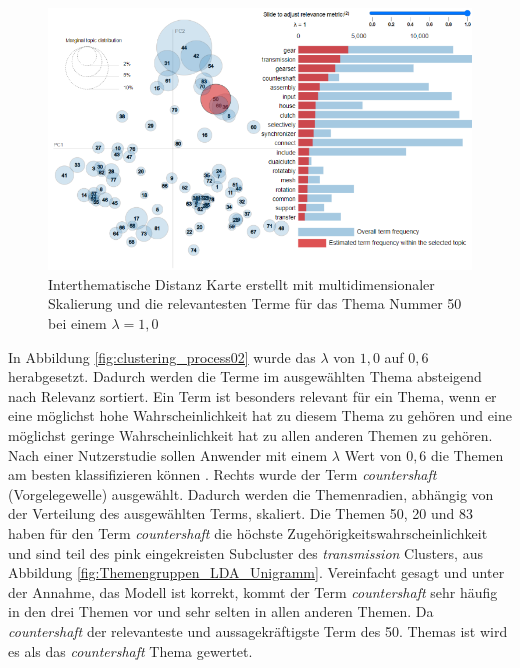 \begin{landscape}
 \begin{figure}
	\centering
	\includegraphics[width=19.29cm,keepaspectratio=true]{img/clustering_process01.png}
	\caption{
		Interthematische Distanz Karte erstellt mit multidimensionaler Skalierung und die relevantesten Terme für das Thema Nummer 50 bei einem $\lambda = 1,0$
	}
	\label{fig:clustering_process01}
 \end{figure}
\end{landscape}

 
 
In Abbildung \ref{fig:clustering_process02} wurde das $\lambda$ von $1,0$ auf $0,6$ herabgesetzt. Dadurch werden die Terme im ausgewählten Thema absteigend nach Relevanz sortiert. Ein Term ist besonders relevant für ein Thema, wenn er eine möglichst hohe Wahrscheinlichkeit hat zu diesem Thema zu gehören und eine möglichst geringe Wahrscheinlichkeit hat zu allen anderen Themen zu gehören. Nach einer Nutzerstudie sollen Anwender mit einem  $\lambda$ Wert von $0,6$ die Themen am besten klassifizieren können \parencite[vgl.][S. 66-68]{sievert2014ldavis}. Rechts wurde der Term \emph{countershaft} (Vorgelegewelle) ausgewählt. Dadurch werden die Themenradien, abhängig von der Verteilung des ausgewählten Terms, skaliert. Die Themen 50, 20 und 83 haben für den Term \emph{countershaft} die höchste Zugehörigkeitswahrscheinlichkeit und sind teil des pink eingekreisten Subcluster des \emph{transmission} Clusters, aus Abbildung \ref{fig:Themengruppen_LDA_Unigramm}. Vereinfacht gesagt und unter der Annahme, das Modell ist korrekt, kommt der Term \emph{countershaft} sehr häufig in den drei Themen vor und sehr selten in allen anderen Themen. Da \emph{countershaft} der relevanteste und aussagekräftigste Term des 50. Themas ist wird es als das \emph{countershaft} Thema gewertet.

